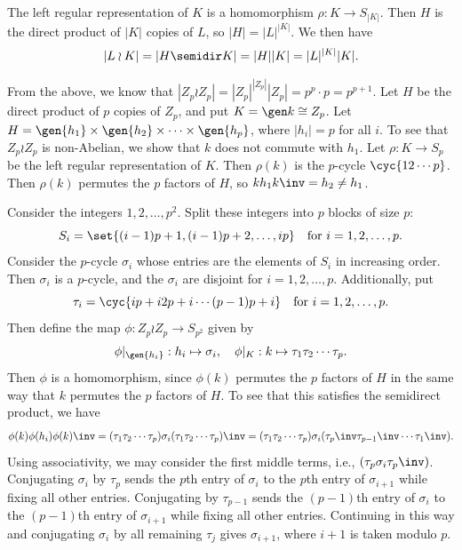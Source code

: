 \begin{solenum}
    \item The left regular representation of $K$ is a homomorphism $\rho : K \to S_{|K|}$.
    Then $H$ is the direct product of $|K|$ copies of $L$, so $|H| = |L|^{|K|}$.
    We then have
    \[
        |L \wr K| = |H \semidir K| = |H||K| = |L|^{|K|}|K|.
    \]
    \item From the above, we know that $|Z_p \wr Z_p| = |Z_p|^{|Z_p|}|Z_p| = p^p \cdot p = p^{p + 1}$.
    Let $H$ be the direct product of $p$ copies of $Z_p$, and put $K = \gen k \cong Z_p$.
    Let $H = \gen{h_1} \times \gen{h_2} \times \cdots \times \gen{h_p}$, where $|h_i| = p$ for all $i$.
    To see that $Z_p \wr Z_p$ is non-Abelian, we show that $k$ does not commute with $h_1$.
    Let $\rho : K \to S_p$ be the left regular representation of $K$.
    Then $\rho(k)$ is the $p$-cycle $\cyc{1 2 \cdots p}$.
    Then $\rho(k)$ permutes the $p$ factors of $H$, so $kh_1k\inv = h_2 \neq h_1$.

    Consider the integers $1, 2, \ldots, p^2$.
    Split these integers into $p$ blocks of size $p$:
    \[
        S_i = \set{(i - 1)p + 1, (i - 1)p + 2, \ldots, ip} \quad \text{for}~ i = 1, 2, \ldots, p.
    \]
    Consider the $p$-cycle $\sigma_i$ whose entries are the elements of $S_i$ in increasing order.
    Then $\sigma_i$ is a $p$-cycle, and the $\sigma_i$ are disjoint for $i = 1, 2, \ldots, p$.
    Additionally, put
    \[
        \tau_i = \cyc{i {p + i} {2p + i} \cdots {(p - 1)p + i}} \quad \text{for}~ i = 1, 2, \ldots, p.
    \]
    Then define the map $\phi : Z_p \wr Z_p \to S_{p^2}$ given by
    \[
        \phi|_{\gen{h_i}} : h_i \mapsto \sigma_i, \quad \phi|_K : k \mapsto \tau_1 \tau_2 \cdots \tau_p.
    \]
    Then $\phi$ is a homomorphism, since $\phi(k)$ permutes the $p$ factors of $H$ in the same way that $k$ permutes the $p$ factors of $H$.
    To see that this satisfies the semidirect product, we have
    \[
        \phi(k)\phi(h_i)\phi(k)\inv = (\tau_1 \tau_2 \cdots \tau_p)\sigma_i(\tau_1 \tau_2 \cdots \tau_p)\inv = (\tau_1 \tau_2 \cdots \tau_p)\sigma_i(\tau_p\inv \tau_{p - 1}\inv \cdots \tau_1\inv).
    \]
    Using associativity, we may consider the first middle terms, i.e., $(\tau_p \sigma_i \tau_p\inv)$.
    Conjugating $\sigma_i$ by $\tau_p$ sends the $p$th entry of $\sigma_i$ to the $p$th entry of $\sigma_{i + 1}$ while fixing all other entries.
    Conjugating by $\tau_{p - 1}$ sends the $(p - 1)$th entry of $\sigma_i$ to the $(p - 1)$th entry of $\sigma_{i + 1}$ while fixing all other entries.
    Continuing in this way and conjugating $\sigma_i$ by all remaining $\tau_j$ gives $\sigma_{i + 1}$, where $i + 1$ is taken modulo $p$.


\end{solenum}
